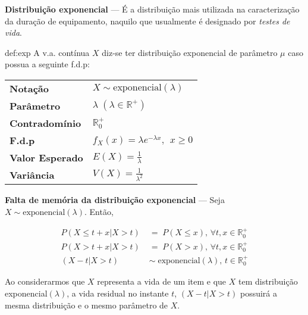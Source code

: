 \newpage
\noindent \textbf{Distribuição exponencial} --- É a distribuição mais utilizada na caracterização da duração de equipamento, naquilo que usualmente é designado por \textit{testes de vida}.

\begin{theo}{def:exp}\label{def:exp}
    \noindent A v.a. contínua $X$ diz-se ter distribuição exponencial de parâmetro $\mu$ caso possua a seguinte f.d.p:

    \vspace{0.5 em}
    \begin{center}
        \begin{tabular}{p{4cm}p{8cm}}
            \toprule
            \textbf{Notação} & $X \sim \text{exponencial}(\lambda)$\\
            \addlinespace
            \textbf{Parâmetro} & $\lambda\; (\lambda \in \mathbb{R}^+)$\\
            \addlinespace
            \textbf{Contradomínio} & $\mathbb{R}^+_0$\\
            \addlinespace
            \textbf{F.d.p} & $f_X(x)= \lambda e^{-\lambda x},\,\; x \ge 0$\\
            \addlinespace
            \textbf{Valor Esperado} & $E(X) = \frac{1}{\lambda}$\\
            \addlinespace
            \textbf{Variância} & $V(X) = \frac{1}{\lambda^2}$\\
            \bottomrule
        \end{tabular}
    \end{center}

    \noindent \textbf{Falta de memória da distribuição exponencial} --- Seja $X \sim \text{exponencial}(\lambda)$. Então,

    \vspace{-1 em}
    \begin{align*}
        P(X \leq t + x | X > t)\; &=\; P(X \leq x),\, \forall t,x \in \mathbb{R}^+_0\\
        P(X > t + x | X > t)\; &=\; P(X > x),\, \forall t,x \in \mathbb{R}^+_0\\
        (X - t | X > t)\; &\sim\; \text{exponencial}(\lambda),\, t \in \mathbb{R}^+_0
    \end{align*}

    \noindent Ao considerarmos que $X$ representa a vida de um item e que $X$ tem distribuição exponencial$(\lambda)$, a vida residual no instante $t$, $(X - t | X > t)$ possuirá a mesma distribuição e o mesmo parâmetro de $X$.
    
\vspace{0.5 em}
\end{theo}

